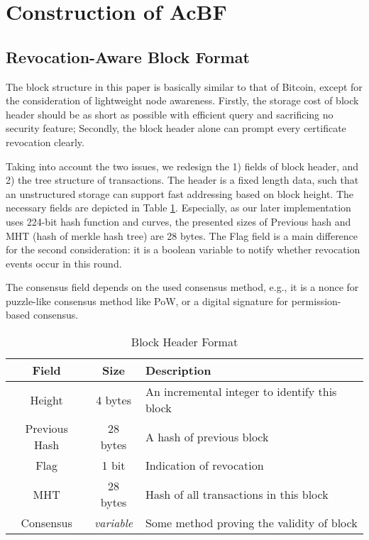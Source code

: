 \documentclass[conference]{IEEEtran}
\begin{document}
\section{Construction of AcBF}\label{sec:construction}
\subsection{Revocation-Aware Block Format}
\label{sec:format}
The block structure in this paper is basically similar to that of Bitcoin, except for the consideration of lightweight node awareness. Firstly, the storage cost of block header should be as short as possible with efficient query and sacrificing no security feature; Secondly, the block header alone can prompt every certificate revocation clearly. 

Taking into account the two issues, we redesign the 1) fields of block header, and 2) the tree structure of transactions. The header is a fixed length data, such that an unstructured storage can support fast addressing based on block height. The necessary fields are depicted in Table \ref{table:format}. Especially, as our later implementation uses 224-bit hash function and curves, the presented sizes of Previous hash and MHT (hash of merkle hash tree) are 28 bytes. The Flag field is a main difference for the second consideration: it is a boolean variable to notify whether revocation events occur in this round.

The consensus field depends on the used consensus method, e.g., it is a nonce for puzzle-like consensus method like PoW, or a digital signature for permission-based consensus.


\begin{table}[t] 
	\caption{Block Header Format}\label{table:format}
	\centering
	\begin{tabular}{c|c|l}
		\hline\hline
		Field & Size & Description \\
		\hline
		Height & 4 bytes & An incremental integer to identify this block \\
		Previous Hash & 28 bytes & A hash of previous block \\
		Flag & 1 bit & Indication of revocation \\
		MHT & 28 bytes & Hash of all transactions in this block \\
		Consensus & \textit{variable} & Some method proving the validity of block\\
		\hline
	\end{tabular}
\end{table}
\end{document}
